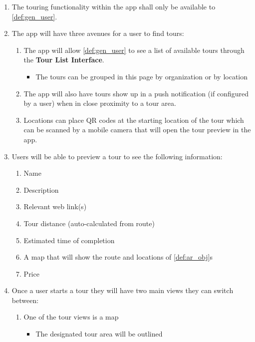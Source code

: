 \documentclass{article}
\begin{document}
\begin{enumerate}[align=left, label=\textbf{TR-FR\arabic*:}]
    \item The touring functionality within the app shall only be available to \ref{def:gen_user}.
    \item The app will have three avenues for a user to find tours:
    \begin{enumerate}[align=left, label=\textbf{TR-FR2.\arabic*:}]
        \item The app will allow \ref{def:gen_user} to see a list of available tours through the \textbf{Tour List Interface}.
        \begin{itemize}
            \item The tours can be grouped in this page by organization or by location
        \end{itemize}
        \item The app will also have tours show up in a push notification (if configured by a user) when in close proximity to a tour area.
        \item Locations can place QR codes at the starting location of the tour which can be scanned by a mobile camera that will open the tour preview in the app.
    \end{enumerate}
    \item Users will be able to preview a tour to see the following information:
    \begin{enumerate}
        \item Name
        \item Description
        \item Relevant web link(s)
        \item Tour distance (auto-calculated from route)
        \item Estimated time of completion
        \item A map that will show the route and locations of \ref{def:ar_obj}s
        \item Price
    \end{enumerate}
    \item Once a user starts a tour they will have two main views they can switch between:
    \begin{enumerate}[align=left, label=\textbf{TR-FR4.\arabic*:}]
        \item One of the tour views is a map
        \begin{itemize}
            \item The designated tour area will be outlined

\end{itemize}
\end{enumerate}
\end{enumerate}
\end{document}
